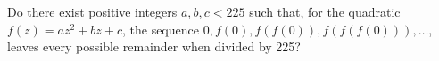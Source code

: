 \begin{problem}
    Do there exist positive integers \( a, b, c < 225 \) such that, for the quadratic \( f\left(z\right) = az^2 + bz + c \), the sequence \( 0, f\left(0\right), f\left(f\left(0\right)\right), f\left(f\left(f\left(0\right)\right)\right), \ldots \), leaves every possible remainder when divided by 225?
\end{problem}

